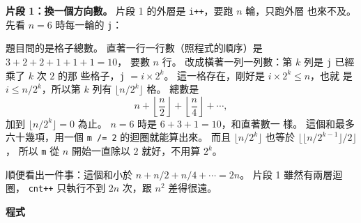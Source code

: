 \textbf{片段 1：換一個方向數。} 片段 1 的外層是 \texttt{i++}，要跑 $n$ 輪，只跑外層
也來不及。 先看 $n = 6$ 時每一輪的 \texttt{j}：

\begin{center}
\label{fig:piece1-grid}
\end{center}

題目問的是格子總數。 直著一行一行數（照程式的順序）是 $3 + 2 + 2 + 1 + 1 + 1 = 10$，
要數 $n$ 行。 改成橫著一列一列數：第 $k$ 列是 \texttt{j} 已經乘了 $k$ 次 $2$ 的那
些格子，\texttt{j} $= i \times 2^k$。 這一格存在，剛好是 $i \times 2^k \le n$，也就
是 $i \le n / 2^k$，所以第 $k$ 列有 $\lfloor n / 2^k \rfloor$ 格。 總數是
\[
n + \left\lfloor \frac{n}{2} \right\rfloor + \left\lfloor \frac{n}{4} \right\rfloor + \cdots,
\]
加到 $\lfloor n / 2^k \rfloor = 0$ 為止。 $n = 6$ 時是 $6 + 3 + 1 = 10$，和直著數一
樣。 這個和最多六十幾項，用一個 \texttt{m /= 2} 的迴圈就能算出來。 而且
$\lfloor n / 2^k \rfloor$ 也等於 $\lfloor \lfloor n / 2^{k-1} \rfloor / 2 \rfloor$，
所以 \texttt{m} 從 $n$ 開始一直除以 $2$ 就好，不用算 $2^k$。

順便看出一件事：這個和小於 $n + n/2 + n/4 + \cdots = 2n$。 片段 1 雖然有兩層迴圈，
\texttt{cnt++} 只執行不到 $2n$ 次，跟 $n^2$ 差得很遠。

\textbf{程式}

